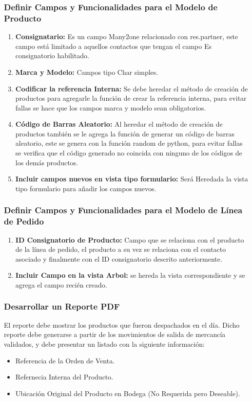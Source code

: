 \documentclass[11pt,letterpaper]{article}
\begin{document}
\subsubsection{Definir Campos y Funcionalidades para el Modelo de Producto}
\begin{enumerate}
	\item \textbf{Consignatario:} Es un campo Many2one relacionado con res.partner, este campo está limitado a aquellos contactos que tengan el campo Es consignatorio habilitado.
	\item \textbf{Marca y Modelo:} Campos tipo Char simples.
	\item \textbf{Codificar la referencia Interna:} Se debe heredar el método de creación de productos para agregarle la función de crear la referencia interna, para evitar fallas se hace que los campos marca y modelo sean obligatorios.
	\item \textbf{Código de Barras Aleatorio:} Al heredar el método de creación de productos también se le agrega la función de generar un código de barras aleatorio, este se genera con la función random de python, para evitar fallas se verifica que el código generado no coincida con ninguno de los códigos de los demás productos.
	\item \textbf{Incluir campos nuevos en vista tipo formulario:} Será Heredada la vista tipo formulario para añadir los campos nuevos.
\end{enumerate}
\subsubsection{Definir Campos y Funcionalidades para el Modelo de Línea de Pedido}
\begin{enumerate}
	\item \textbf{ID Consignatorio de Producto:} Campo que se relaciona con el producto de la línea de pedido, el producto a su vez se relaciona con el contacto asociado y finalmente con el ID consignatorio descrito anteriormente.
	\item \textbf{Incluir Campo en la vista Arbol:} se hereda la vista correspondiente y se agrega el campo recién creado.
\end{enumerate}
\subsubsection{Desarrollar un Reporte PDF}
El reporte debe mostrar los productos que fueron despachados en el día. Dicho reporte debe generarse a partir de los movimientos de salida de mercancía validados, y debe presentar un listado con la siguiente información:
\begin{itemize}
	\item Referencia de la Orden de Venta.
	\item Refernecia Interna del Producto.
	\item Ubicación Original del Producto en Bodega (No Requerida pero Deseable).
\end{itemize}
\end{document}
